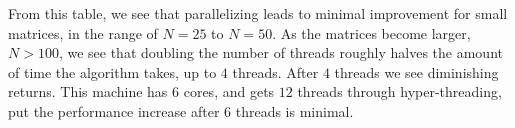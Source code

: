 \documentclass[11pt]{article}
\begin{document}
\begin{enumerate}
From this table, we see that parallelizing leads to minimal improvement for small matrices, in the range of $N=25$ to $N=50$. As the matrices become larger, $N>100$, we see that doubling the number of threads roughly halves the amount of time the algorithm takes, up to $4$ threads. After $4$ threads we see diminishing returns. This machine has $6$ cores, and gets $12$ threads through hyper-threading, put the performance increase after $6$ threads is minimal. 














\end{enumerate}
\end{document}
